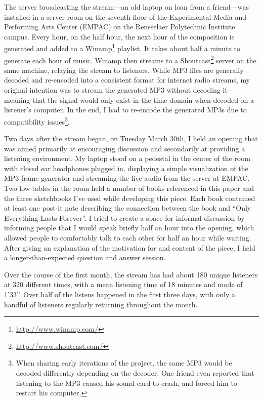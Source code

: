 \documentclass{thesis}
\begin{document}
The server broadcasting the stream---an old laptop on loan from a friend---was installed in a server room on the seventh floor of the Experimental Media and Performing Arts Center (EMPAC) on the Rensselaer Polytechnic Institute campus. Every hour, on the half hour, the next hour of the composition is generated and added to a Winamp\footnote{\url{http://www.winamp.com/}} playlist. It takes about half a minute to generate each hour of music. Winamp then streams to a Shoutcast\footnote{\url{http://www.shoutcast.com/}} server on the same machine, relaying the stream to listeners. While MP3 files are generally decoded and re-encoded into a consistent format for internet radio streams, my original intention was to stream the generated MP3 without decoding it---meaning that the signal would only exist in the time domain when decoded on a listener's computer. In the end, I had to re-encode the generated MP3s due to compatibility issues\footnote{When sharing early iterations of the project, the same MP3 would be decoded differently depending on the decoder. One friend even reported that listening to the MP3 caused his sound card to crash, and forced him to restart his computer.}.

Two days after the stream began, on Tuesday March 30th, I held an opening that was aimed primarily at encouraging discussion and secondarily at providing a listening environment. My laptop stood on a pedestal in the center of the room with closed ear headphones plugged in, displaying a simple visualization of the MP3 frame generator and streaming the live audio from the server at EMPAC. Two low tables in the room held a number of books referenced in this paper and the three sketchbooks I've used while developing this piece. Each book contained at least one post-it note describing the connection between the book and ``Only Everything Lasts Forever''. I tried to create a space for informal discussion by informing people that I would speak briefly half an hour into the opening, which allowed people to comfortably talk to each other for half an hour while waiting. After giving an explanation of the motivation for and content of the piece, I held a longer-than-expected question and answer session.

Over the course of the first month, the stream has had about 180 unique listeners at 320 different times, with a mean listening time of 18 minutes and mode of 1'33''. Over half of the listens happened in the first three days, with only a handful of listeners regularly returning throughout the month.
\end{document}
